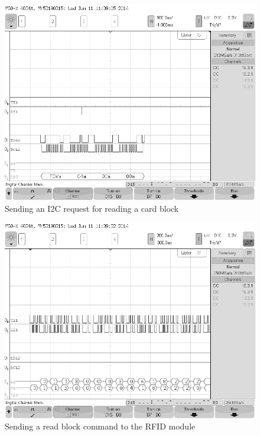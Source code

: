 \documentclass[12pt]{article} %
\begin{document}
	\begin{figure}[H]
		\centering
		\includegraphics[width=\textwidth]{images/scopeimages/cardreadSEQI2c.png}
		\caption{Sending an I2C request for reading a card block}
		\label{fig:read1}
	\end{figure}
	
	\begin{figure}[H]
		\centering
		\includegraphics[width=\textwidth]{images/scopeimages/cardreadSEQRFID.png}
		\caption{Sending a read block command to the RFID module}
		\label{fig:read2}
	\end{figure}
	
\end{document}
